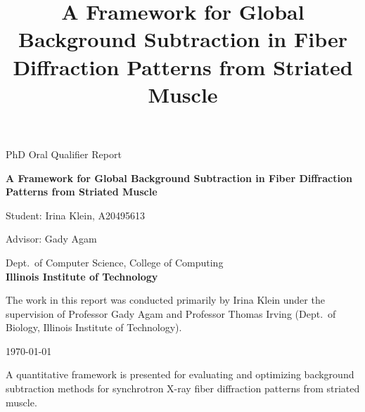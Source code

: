 \documentclass[iucr]{iucrjournals}
\title{A Framework for Global Background Subtraction in Fiber Diffraction Patterns from Striated Muscle}
\author{}
\date{}
\begin{document}
\singlespacing

\nolinenumbers
\begin{titlepage}
    \centering

    {\Large PhD Oral Qualifier Report\par}



    \vspace{3cm}

    {\LARGE\bfseries A Framework for Global Background Subtraction in Fiber Diffraction Patterns from Striated Muscle\par}

    \vspace{3cm}

    \vspace{0.5cm}
    Student: Irina Klein, A20495613\par

    \vspace{1cm}

    {\large Advisor: Gady Agam\par}
    \vspace{1cm}

    
	\footnotesize{Dept.~of Computer Science, College of Computing}\\[.5ex] \large{\bf Illinois Institute of Technology}

    \vspace{2cm}

    The work in this report was conducted primarily by Irina Klein under the supervision of Professor Gady Agam and Professor Thomas Irving (Dept.~of Biology, Illinois Institute of Technology). \par

    \vspace{2cm}


    \vfill

    {\large\today\par}
\end{titlepage}

\linenumbers

\setcounter{page}{1}

\begin{synopsis}
A quantitative framework is presented for evaluating and optimizing background subtraction methods for synchrotron X-ray fiber diffraction patterns from striated muscle.
\end{synopsis}
\end{document}
